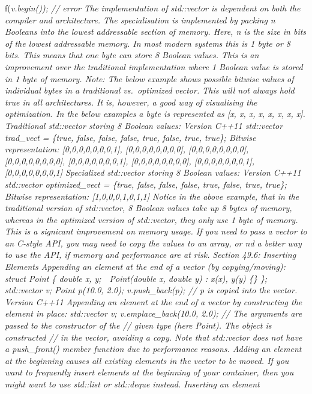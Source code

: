 f(\emph{v.begin()); // error The implementation of std::vector is
dependent on both the compiler and architecture. The specialisation is
implemented by packing n Booleans into the lowest addressable section of
memory. Here, n is the size in bits of the lowest addressable memory. In
most modern systems this is 1 byte or 8 bits. This means that one byte
can store 8 Boolean values. This is an improvement over the traditional
implementation where 1 Boolean value is stored in 1 byte of memory.
Note: The below example shows possible bitwise values of individual
bytes in a traditional vs.~optimized vector. This will not always hold
true in all architectures. It is, however, a good way of visualising the
optimization. In the below examples a byte is represented as {[}x, x, x,
x, x, x, x, x{]}. Traditional std::vector storing 8 Boolean values:
Version C++11 std::vector trad\_vect = \{true, false, false, false,
true, false, true, true\}; Bitwise representation:
{[}0,0,0,0,0,0,0,1{]}, {[}0,0,0,0,0,0,0,0{]}, {[}0,0,0,0,0,0,0,0{]},
{[}0,0,0,0,0,0,0,0{]}, {[}0,0,0,0,0,0,0,1{]}, {[}0,0,0,0,0,0,0,0{]},
{[}0,0,0,0,0,0,0,1{]}, {[}0,0,0,0,0,0,0,1{]} Specialized std::vector
storing 8 Boolean values: Version C++11 std::vector optimized\_vect =
\{true, false, false, false, true, false, true, true\}; Bitwise
representation: {[}1,0,0,0,1,0,1,1{]} Notice in the above example, that
in the traditional version of std::vector, 8 Boolean values take up 8
bytes of memory, whereas in the optimized version of std::vector, they
only use 1 byte of memory. This is a signicant improvement on memory
usage. If you need to pass a vector to an C-style API, you may need to
copy the values to an array, or nd a better way to use the API, if
memory and performance are at risk. Section 49.6: Inserting Elements
Appending an element at the end of a vector (by copying/moving): struct
Point \{ double x, y;  Point(double x, double y) : x(x), y(y) \{\} \};
std::vector v; Point p(10.0, 2.0); v.push\_back(p); // p is copied into
the vector. Version C++11 Appending an element at the end of a vector by
constructing the element in place: std::vector v; v.emplace\_back(10.0,
2.0); // The arguments are passed to the constructor of the // given
type (here Point). The object is constructed // in the vector, avoiding
a copy. Note that std::vector does not have a push\_front() member
function due to performance reasons. Adding an element at the beginning
causes all existing elements in the vector to be moved. If you want to
frequently insert elements at the beginning of your container, then you
might want to use std::list or std::deque instead. Inserting an element
}

